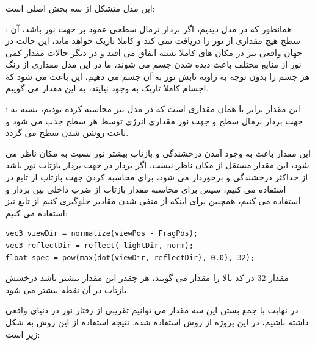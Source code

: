 \documentclass[a4paper, 12pt]{book}
\newcommand{\lrbold}[1]{\lr{\textbf{#1}}}
\newcommand{\lrit}[1]{\lr{\textit{#1}}}
\begin{document}
    \subsubsection*{}
        این مدل متشکل از سه بخش اصلی است:\par
    \lrbold{ambient}:
    همانطور که در مدل  دیدیم، اگر بردار نرمال سطحی عمود بر جهت نور باشد، آن سطح هیچ مقداری از نور را دریافت نمی کند و کاملا تاریک خواهد ماند، این حالت در جهان واقعی نیز در مکان های کاملا بسته اتفاق می افتد و در دیگر حالات مقدار کمی نور از منابع مختلف باعث دیده شدن جسم می شوند، ما در این مدل مقداری از رنگ هر جسم را بدون توجه به زاویه تابش نور به آن جسم می دهیم، این باعث می شود که اجسام کاملا تاریک به وجود نیایند، به این مقدار  می گوییم.\par

    \lrbold{diffuse}:
    این مقدار برابر با همان مقداری است که در مدل  نیز محاسبه کرده بودیم، بسته به جهت بردار نرمال سطح و جهت نور مقداری انرژی توسط هر سطح جذب می شود و باعث روشن شدن سطح می گردد.\par

    \lrbold{specular}
    این مقدار باعث به وجود آمدن درخشندگی و بازتاب بیشتر نور نسبت به مکان ناظر می شود، این مقدار مستقل از مکان ناظر نیست، اگر بردار  در جهت بردار بازتاب نور باشد از حداکثر درخشندگی و  برخوردار می شود، برای محاسبه کردن جهت بازتاب از تابع  در  استفاده می کنیم، سپس برای محاسبه مقدار بازتاب از ضرب داخلی بین بردار  و  استفاده می کنیم، همچنین برای اینکه از منفی شدن مقادیر جلوگیری کنیم از تابع  نیز استفاده می کنیم:


    \begin{LTR}
    \small
        \begin{lstlisting}[style=C++Style,caption=\lrit{calculating specular component}]
vec3 viewDir = normalize(viewPos - FragPos);
vec3 reflectDir = reflect(-lightDir, norm);
float spec = pow(max(dot(viewDir, reflectDir), 0.0), 32);
        \end{lstlisting}
    \end{LTR}
    \normalsize
    \vspace*{0.3cm}

    مقدار 32 در کد بالا را مقدار  می گویند، هر چقدر این مقدار بیشتر باشد درخشش بازتاب در آن نقطه بیشتر می شود.\par
    در نهایت با جمع بستن این سه مقدار می توانیم تقریبی از رفتار نور در دنیای واقعی داشته باشیم، در این پروژه از روش  استفاده شده.
    نتیجه استفاده از این روش به شکل زیر است:
\end{document}
